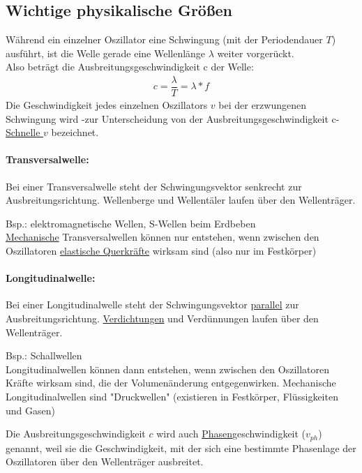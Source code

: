 \documentclass[12 pt]{article}
\numberwithin{equation}{section}
\begin{document}
	\subsection{Wichtige physikalische Größen}
	Während ein einzelner Oszillator eine Schwingung (mit der Periodendauer $T$) ausführt, ist die Welle gerade eine Wellenlänge $\lambda$ weiter vorgerückt.\\
	Also beträgt die Ausbreitungsgeschwindigkeit c der Welle:
	\begin{align}
		c=\dfrac{\lambda}{T}=\lambda*f
	\end{align}
	Die Geschwindigkeit jedes einzelnen Oszillators $v$ bei der erzwungenen Schwingung wird -zur Unterscheidung von der Ausbreitungsgeschwindigkeit c- \underline{Schnelle $v$} bezeichnet.
	
	\paragraph{Transversalwelle:} Bei einer Transversalwelle steht der Schwingungsvektor senkrecht zur Ausbreitungsrichtung.
	Wellenberge und Wellentäler laufen über den Wellenträger.
	
	Bsp.: elektromagnetische Wellen, S-Wellen beim Erdbeben\\
	\underline{Mechanische} Transversalwellen können nur entstehen, wenn zwischen den Oszillatoren \underline{elastische Querkräfte} wirksam sind (also nur im Festkörper)
	
	\paragraph{Longitudinalwelle:} Bei einer Longitudinalwelle steht der Schwingungsvektor \underline{parallel} zur Ausbreitungsrichtung. \underline{Verdichtungen} und Verdünnungen laufen über den Wellenträger.
	
	Bsp.: Schallwellen\\
	Longitudinalwellen können dann entstehen, wenn zwischen den Oszillatoren Kräfte wirksam sind, die der Volumenänderung entgegenwirken. Mechanische Longitudinalwellen sind "Druckwellen" (existieren in Festkörper, Flüssigkeiten und Gasen)
	
	Die Ausbreitungsgeschwindigkeit $c$ wird auch \underline{Phasen}geschwindigkeit ($v_{ph}$) genannt, weil sie die Geschwindigkeit, mit der sich eine bestimmte Phasenlage der Oszillatoren über den Wellenträger ausbreitet.
	
\end{document}
